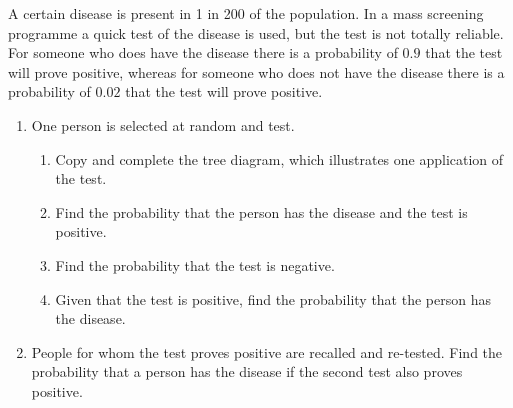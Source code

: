 \begin{problem}
    A certain disease is present in 1 in 200 of the population. In a mass screening programme a quick test of the disease is used, but the test is not totally reliable. For someone who does have the disease there is a probability of $0.9$ that the test will prove positive, whereas for someone who does not have the disease there is a probability of $0.02$ that the test will prove positive.
    \begin{center}
    \end{center}
    \begin{enumerate}
        \item One person is selected at random and test.
        \begin{enumerate}
            \item Copy and complete the tree diagram, which illustrates one application of the test.
            \item Find the probability that the person has the disease and the test is positive.
            \item Find the probability that the test is negative.
            \item Given that the test is positive, find the probability that the person has the disease.
        \end{enumerate}
        \item People for whom the test proves positive are recalled and re-tested. Find the probability that a person has the disease if the second test also proves positive.
    \end{enumerate}
\end{problem}
\clearpage
